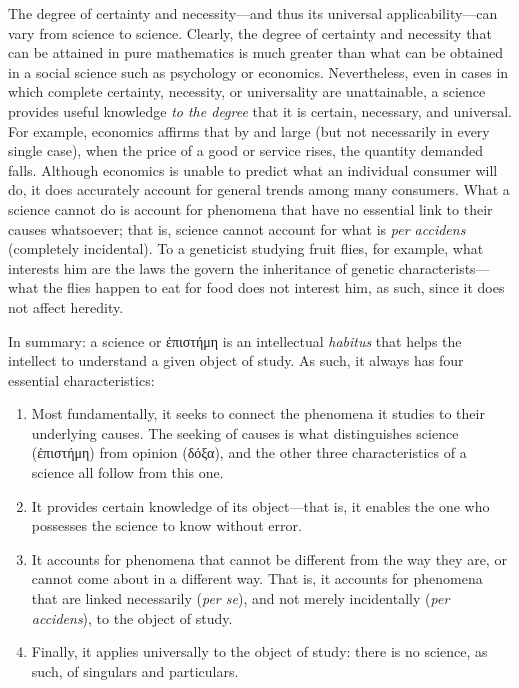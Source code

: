 \documentclass[
  12pt,
]{memoir}
\begin{document}
The degree of certainty and necessity---and thus its universal
applicability---can vary from science to science. Clearly, the degree of
certainty and necessity that can be attained in pure mathematics is much
greater than what can be obtained in a social science such as psychology
or economics. Nevertheless, even in cases in which complete certainty,
necessity, or universality are unattainable, a science provides useful
knowledge \emph{to the degree} that it is certain, necessary, and
universal. For example, economics affirms that by and large (but not
necessarily in every single case), when the price of a good or service
rises, the quantity demanded falls. Although economics is unable to
predict what an individual consumer will do, it does accurately account
for general trends among many consumers. What a science cannot do is
account for phenomena that have no essential link to their causes
whatsoever; that is, science cannot account for what is \emph{per
accidens} (completely incidental). To a geneticist studying fruit flies,
for example, what interests him are the laws the govern the inheritance
of genetic characterists---what the flies happen to eat for food does
not interest him, as such, since it does not affect heredity.

In summary: a science or ἐπιστήμη is an intellectual \emph{habitus} that
helps the intellect to understand a given object of study. As such, it
always has four essential characteristics:

\begin{enumerate}
\def\labelenumi{\arabic{enumi}.}
\item
  Most fundamentally, it seeks to connect the phenomena it studies to
  their underlying causes. The seeking of causes is what distinguishes
  science (ἐπιστήμη) from opinion (δόξα), and the other three
  characteristics of a science all follow from this one.
\item
  It provides certain knowledge of its object---that is, it enables the
  one who possesses the science to know without error.
\item
  It accounts for phenomena that cannot be different from the way they
  are, or cannot come about in a different way. That is, it accounts for
  phenomena that are linked necessarily (\emph{per se}), and not merely
  incidentally (\emph{per accidens}), to the object of study.
\item
  Finally, it applies universally to the object of study: there is no
  science, as such, of singulars and particulars.
\end{enumerate}
\end{document}
